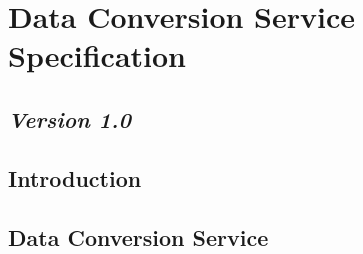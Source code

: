 \chapter{Data Conversion Service Specification}
\section*{\textit{Version 1.0}}
\section{Introduction}
\section{Data Conversion Service}
\orgcishellserviceconversion{}

